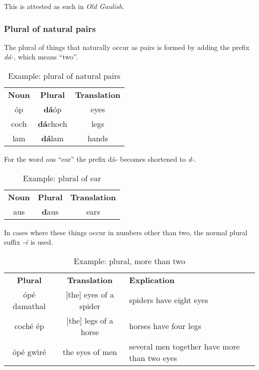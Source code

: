 This is attested as such in \textit{Old Gaulish}.

\subsubsection{Plural of natural pairs}

The plural of things that naturally occur as pairs is formed by adding the prefix \textit{d\'{a}-}, which means ``two''.
\begin{table}[H]
\centering
\begin{tabular}{ccc}
  \toprule
  \textbf{Noun} & \textbf{Plural} & \textbf{Translation}\\
  \cmidrule(lr){1-1}\cmidrule(lr){2-2}\cmidrule(lr){3-3}
  \'{o}p & \textbf{d\'{a}}\'{o}p & eyes\\
  coch & \textbf{d\'{a}}choch & legs\\
  lam & \textbf{d\'{a}}lam & hands\\
  \bottomrule
\end{tabular}
\caption{Example: plural of natural pairs}
\label{example_plural_of_natural_pairs}
\end{table}

For the word aus ``ear'' the prefix d\'{a}- becomes shortened to \textit{d-}.
\begin{table}[H]
\centering
\begin{tabular}{ccc}
  \toprule
  \textbf{Noun} & \textbf{Plural} & \textbf{Translation}\\
  \cmidrule(lr){1-1}\cmidrule(lr){2-2}\cmidrule(lr){3-3}
  aus & \textbf{d}aus & ears\\
  \bottomrule
\end{tabular}
\caption{Example: plural of ear}
\label{example_plural_of_ear}
\end{table}

In cases where these things occur in numbers other than two, the normal plural suffix \textit{-\'{e}} is used.
\begin{table}[H]
\centering
\begin{tabular}{ccM{10.0cm}}
  \toprule
  \textbf{Plural} & \textbf{Translation} & \textbf{Explication}\\
  \cmidrule(lr){1-1}\cmidrule(lr){2-2}\cmidrule(lr){3-3}
  \'{o}p\'{e} damathal & $[$the$]$ eyes of a spider & spiders have eight eyes\\
  coch\'{e} \'{e}p & $[$the$]$ legs of a horse & horses have four legs\\
  \'{o}p\'{e} gw\'{\i}r\'{e} & the eyes of men & several men together have more than two eyes\\
  \bottomrule
\end{tabular}
\caption{Example: plural, more than two}
\label{example_plural_more_than_two}
\end{table}

